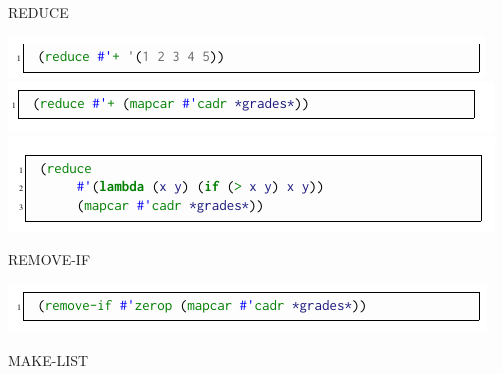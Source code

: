 \documentclass[ignorenonframetext,10pt,aspectratio=169]{beamer}
\begin{document}
\begin{frame}[t,plain]{REDUCE}

\includegraphics[scale=0.7]{img/redplus.png}
\pause
\includegraphics[scale=0.7]{img/redgrades.png}
\pause
\includegraphics[scale=0.7]{img/redmax.png}

\end{frame}

\begin{frame}[t,plain]{REMOVE-IF}

\includegraphics[scale=0.7]{img/remif1.png}

\end{frame}

\begin{frame}[t,plain]{MAKE-LIST}


\end{frame}
\end{document}
